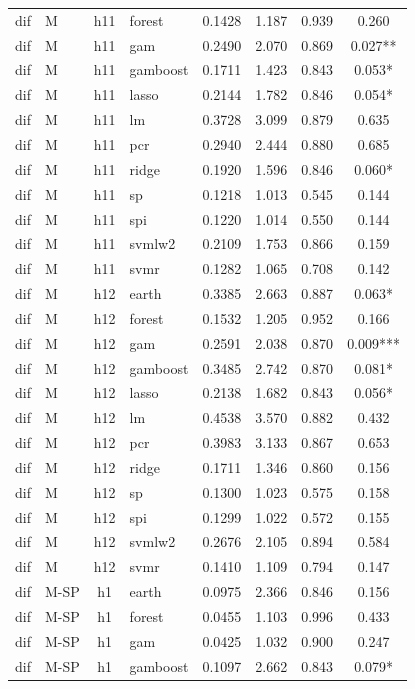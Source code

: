 \begin{ThreePartTable}
\begin{longtable}[t]{llclcccc}
dif & M & h11 & forest & 0.1428 & 1.187 & 0.939 & 0.260\\
dif & M & h11 & gam & 0.2490 & 2.070 & 0.869 & 0.027**\\
dif & M & h11 & gamboost & 0.1711 & 1.423 & 0.843 & 0.053*\\
dif & M & h11 & lasso & 0.2144 & 1.782 & 0.846 & 0.054*\\
dif & M & h11 & lm & 0.3728 & 3.099 & 0.879 & 0.635\\
dif & M & h11 & pcr & 0.2940 & 2.444 & 0.880 & 0.685\\
dif & M & h11 & ridge & 0.1920 & 1.596 & 0.846 & 0.060*\\
dif & M & h11 & sp & 0.1218 & 1.013 & 0.545 & 0.144\\
dif & M & h11 & spi & 0.1220 & 1.014 & 0.550 & 0.144\\
dif & M & h11 & svmlw2 & 0.2109 & 1.753 & 0.866 & 0.159\\
dif & M & h11 & svmr & 0.1282 & 1.065 & 0.708 & 0.142\\
\addlinespace
dif & M & h12 & earth & 0.3385 & 2.663 & 0.887 & 0.063*\\
dif & M & h12 & forest & 0.1532 & 1.205 & 0.952 & 0.166\\
dif & M & h12 & gam & 0.2591 & 2.038 & 0.870 & 0.009***\\
dif & M & h12 & gamboost & 0.3485 & 2.742 & 0.870 & 0.081*\\
dif & M & h12 & lasso & 0.2138 & 1.682 & 0.843 & 0.056*\\
dif & M & h12 & lm & 0.4538 & 3.570 & 0.882 & 0.432\\
dif & M & h12 & pcr & 0.3983 & 3.133 & 0.867 & 0.653\\
dif & M & h12 & ridge & 0.1711 & 1.346 & 0.860 & 0.156\\
dif & M & h12 & sp & 0.1300 & 1.023 & 0.575 & 0.158\\
dif & M & h12 & spi & 0.1299 & 1.022 & 0.572 & 0.155\\
dif & M & h12 & svmlw2 & 0.2676 & 2.105 & 0.894 & 0.584\\
dif & M & h12 & svmr & 0.1410 & 1.109 & 0.794 & 0.147\\
\addlinespace
dif & M-SP & h1 & earth & 0.0975 & 2.366 & 0.846 & 0.156\\
dif & M-SP & h1 & forest & 0.0455 & 1.103 & 0.996 & 0.433\\
dif & M-SP & h1 & gam & 0.0425 & 1.032 & 0.900 & 0.247\\
dif & M-SP & h1 & gamboost & 0.1097 & 2.662 & 0.843 & 0.079*\\

\end{longtable}
\end{ThreePartTable}
